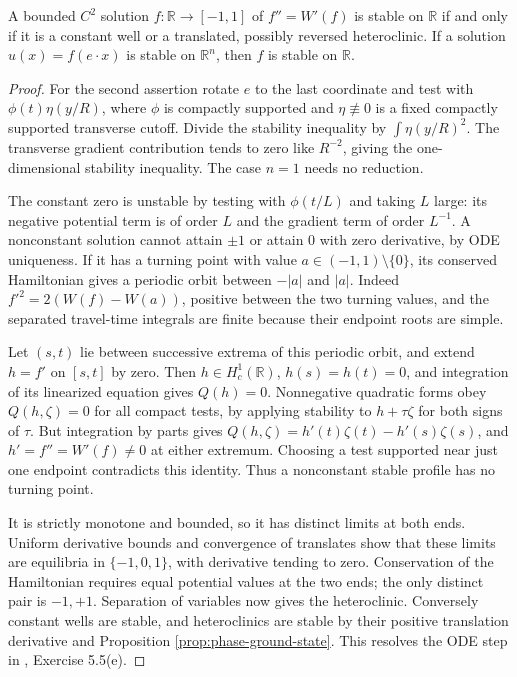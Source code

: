 \begin{lemma}\label{lem:phase-stable-ode}
A bounded $C^2$ solution $f:\mathbb R\to[-1,1]$ of $f''=W'(f)$ is stable on $\mathbb R$ if and only if it is a constant well or a translated, possibly reversed heteroclinic. If a solution $u(x)=f(e\cdot x)$ is stable on $\mathbb R^n$, then $f$ is stable on $\mathbb R$.
\end{lemma}
\begin{proof}
For the second assertion rotate $e$ to the last coordinate and test with $\phi(t)\eta(y/R)$, where $\phi$ is compactly supported and $\eta\not\equiv0$ is a fixed compactly supported transverse cutoff. Divide the stability inequality by $\int\eta(y/R)^2$. The transverse gradient contribution tends to zero like $R^{-2}$, giving the one-dimensional stability inequality. The case $n=1$ needs no reduction.

The constant zero is unstable by testing with $\phi(t/L)$ and taking $L$ large: its negative potential term is of order $L$ and the gradient term of order $L^{-1}$. A nonconstant solution cannot attain $\pm1$ or attain $0$ with zero derivative, by ODE uniqueness. If it has a turning point with value $a\in(-1,1)\setminus\{0\}$, its conserved Hamiltonian gives a periodic orbit between $-|a|$ and $|a|$. Indeed $f'^2=2(W(f)-W(a))$, positive between the two turning values, and the separated travel-time integrals are finite because their endpoint roots are simple.

Let $(s,t)$ lie between successive extrema of this periodic orbit, and extend $h=f'$ on $[s,t]$ by zero. Then $h\in H^1_c(\mathbb R)$, $h(s)=h(t)=0$, and integration of its linearized equation gives $Q(h)=0$. Nonnegative quadratic forms obey $Q(h,\zeta)=0$ for all compact tests, by applying stability to $h+\tau\zeta$ for both signs of $\tau$. But integration by parts gives
$Q(h,\zeta)=h'(t)\zeta(t)-h'(s)\zeta(s)$, and $h'=f''=W'(f)\ne0$ at either extremum. Choosing a test supported near just one endpoint contradicts this identity. Thus a nonconstant stable profile has no turning point.

It is strictly monotone and bounded, so it has distinct limits at both ends. Uniform derivative bounds and convergence of translates show that these limits are equilibria in $\{-1,0,1\}$, with derivative tending to zero. Conservation of the Hamiltonian requires equal potential values at the two ends; the only distinct pair is $-1,+1$. Separation of variables now gives the heteroclinic. Conversely constant wells are stable, and heteroclinics are stable by their positive translation derivative and Proposition \ref{prop:phase-ground-state}. This resolves the ODE step in \cite{ChAC}, Exercise 5.5(e).
\end{proof}

